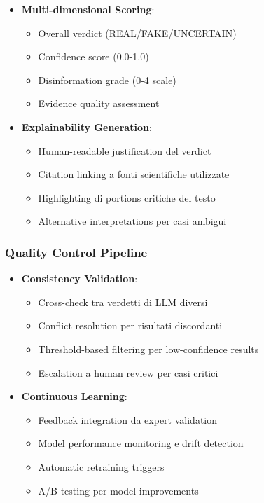 \documentclass[12pt,a4paper]{report}
\begin{document}
\begin{itemize}
    \item \textbf{Multi-dimensional Scoring}:
    \begin{itemize}
        \item Overall verdict (REAL/FAKE/UNCERTAIN)
        \item Confidence score (0.0-1.0)
        \item Disinformation grade (0-4 scale)
        \item Evidence quality assessment
    \end{itemize}
    
    \item \textbf{Explainability Generation}:
    \begin{itemize}
        \item Human-readable justification del verdict
        \item Citation linking a fonti scientifiche utilizzate
        \item Highlighting di portions critiche del testo
        \item Alternative interpretations per casi ambigui
    \end{itemize}
\end{itemize}

\subsubsection{Quality Control Pipeline}

\begin{itemize}
    \item \textbf{Consistency Validation}:
    \begin{itemize}
        \item Cross-check tra verdetti di LLM diversi
        \item Conflict resolution per risultati discordanti
        \item Threshold-based filtering per low-confidence results
        \item Escalation a human review per casi critici
    \end{itemize}
    
    \item \textbf{Continuous Learning}:
    \begin{itemize}
        \item Feedback integration da expert validation
        \item Model performance monitoring e drift detection
        \item Automatic retraining triggers
        \item A/B testing per model improvements
    \end{itemize}
\end{itemize}
\end{document}
